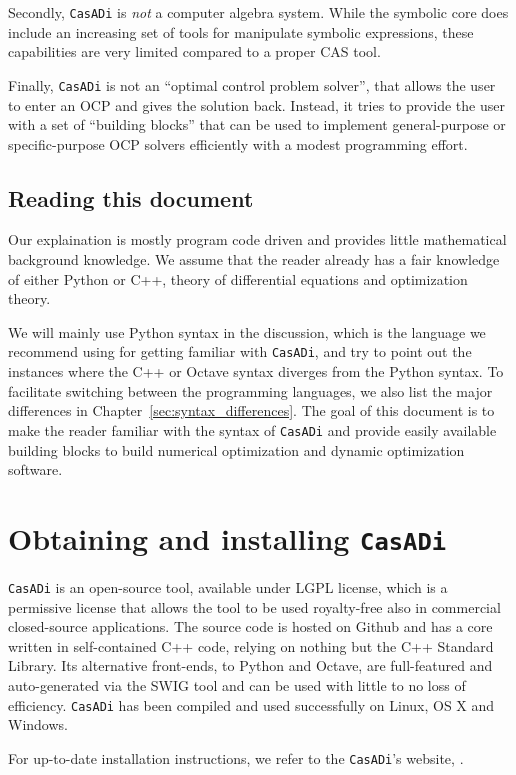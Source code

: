 \documentclass[a4paper,12pt]{book}
\newcommand{\CasADi}{\texttt{CasADi}\xspace}
\begin{document}
Secondly, \CasADi is \emph{not} a computer algebra system. While the symbolic core does include an increasing set of tools for manipulate symbolic expressions, these capabilities are very limited compared to a proper CAS tool.

Finally, \CasADi is not an ``optimal control problem solver'', that allows the user to enter an OCP and gives the solution back. Instead, it tries to provide the user with a set of ``building blocks'' that can be used to implement general-purpose or specific-purpose OCP solvers efficiently with a modest programming effort.

\section{Reading this document}
Our explaination is mostly program code driven and provides little mathematical background knowledge. We assume that the reader already has a fair knowledge of either Python or C++, theory of differential equations and optimization theory. 

We will mainly use Python syntax in the discussion, which is the language we recommend using for getting familiar with \CasADi, and try to point out the instances where the C++ or Octave syntax diverges from the Python syntax. To facilitate switching between the programming languages, we also list the major differences in Chapter~\ref{sec:syntax_differences}. The goal of this document is to make the reader familiar with the syntax of \CasADi and provide easily available building blocks to build numerical optimization and dynamic optimization software.

\chapter{Obtaining and installing \CasADi}
\CasADi is an open-source tool, available under LGPL license, which is a permissive license that allows the tool to be used royalty-free also in commercial closed-source applications. The source code is hosted on Github and has a core written in self-contained C++ code, relying on nothing but the C++ Standard Library. Its alternative front-ends, to Python and Octave, are full-featured and auto-generated via the SWIG tool and can be used with little to no loss of efficiency. \CasADi has been compiled and used successfully on Linux, OS X and Windows.

For up-to-date installation instructions, we refer to the \CasADi's website, .
\end{document}
